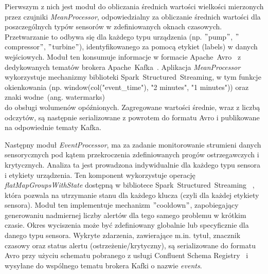 Pierwszym z nich jest moduł do obliczania średnich wartości wielkości mierzonych przez czujniki \textit{\mbox{MeanProcessor}}, odpowiedzialny za obliczanie średnich wartości dla poszczególnych typów sensorów w zdefiniowanych oknach czasowych. Przetwarzanie to odbywa się dla każdego typu urządzenia (np. \("\)pump\("\), \("\)compressor\("\), \("\)turbine\("\)), identyfikowanego za pomocą etykiet (labels) w danych wejściowych. Moduł ten konsumuje informacje w formacie \mbox{Apache Avro}~\cite{avro_documentation} z dedykowanych tematów brokera \mbox{Apache Kafka}~\cite{kafka}. Aplikacja \textit{\mbox{MeanProcessor}} wykorzystuje mechanizmy biblioteki \mbox{Spark Structured Streaming}, w tym funkcje okienkowania (np. window(col("event\_time"), "2 minutes", "1 minutes")) oraz znaki wodne~(ang. watermarks) \\ \cite{watermarking} do obsługi wolumenów opóźnionych. Zagregowane wartości średnie, wraz z liczbą odczytów, są następnie serializowane z powrotem do formatu Avro i publikowane na odpowiednie tematy Kafka.

Następny moduł \textit{EventProcessor}, ma za zadanie monitorowanie strumieni danych sensorycznych pod kątem przekroczenia zdefiniowanych progów ostrzegawczych i krytycznych. Analiza ta jest prowadzona indywidualnie dla każdego typu sensora i etykiety urządzenia. Ten komponent wykorzystuje operację \textit{flatMapGroupsWithState} dostępną w bibliotece \mbox{Spark Structured Streaming}~\cite{spark_streaming} , która pozwala na utrzymanie stanu dla każdego klucza (czyli dla każdej etykiety sensora). Moduł ten implementuje mechanizm \("\)cooldown\("\), zapobiegający generowaniu nadmiernej liczby alertów dla tego samego problemu w krótkim czasie. Okres wyciszenia może być zdefiniowany globalnie lub specyficznie dla danego typu sensora. Wykryte zdarzenia, zawierające m.in. tytuł, znacznik czasowy oraz status alertu (ostrzeżenie/krytyczny), są serializowane do formatu Avro przy użyciu schematu pobranego z usługi Confluent Schema Registry~\cite{confluent_schema_registry} i wysyłane do wspólnego tematu brokera Kafki o nazwie \textit{events}.


